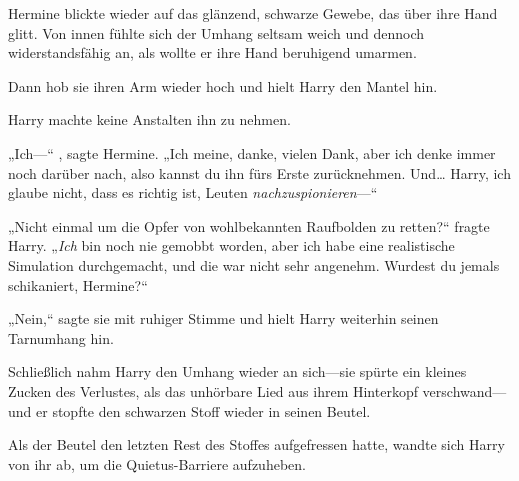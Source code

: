 Hermine blickte wieder auf das glänzend, schwarze Gewebe, das über ihre Hand glitt. Von innen fühlte sich der Umhang seltsam weich und dennoch widerstandsfähig an, als wollte er ihre Hand beruhigend umarmen.

Dann hob sie ihren Arm wieder hoch und hielt Harry den Mantel hin.

Harry machte keine Anstalten ihn zu nehmen.

„Ich—“ , sagte Hermine. „Ich meine, danke, vielen Dank, aber ich denke immer noch darüber nach, also kannst du ihn fürs Erste zurücknehmen. Und… Harry, ich glaube nicht, dass es richtig ist, Leuten \emph{nachzuspionieren}—“

„Nicht einmal um die Opfer von wohlbekannten Raufbolden zu retten?“ fragte Harry. „\emph{Ich} bin noch nie gemobbt worden, aber ich habe eine realistische Simulation durchgemacht, und die war nicht sehr angenehm. Wurdest du jemals schikaniert, Hermine?“

„Nein,“ sagte sie mit ruhiger Stimme und hielt Harry weiterhin seinen Tarnumhang hin.

Schließlich nahm Harry den Umhang wieder an sich—sie spürte ein kleines Zucken des Verlustes, als das unhörbare Lied aus ihrem Hinterkopf verschwand—und er stopfte den schwarzen Stoff wieder in seinen Beutel.

Als der Beutel den letzten Rest des Stoffes aufgefressen hatte, wandte sich Harry von ihr ab, um die Quietus-Barriere aufzuheben.

